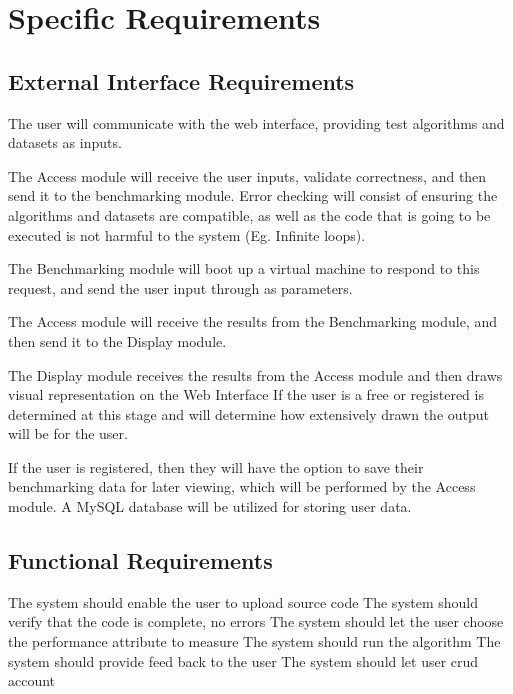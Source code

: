 \documentclass[runningheads,a4paper]{article}
\begin{document}

\section{Specific Requirements}
	\subsection{External Interface Requirements}
		\begin{EIREnum}
			\item The user will communicate with the web interface, providing test algorithms and datasets as inputs.
			\item The Access module will receive the user inputs, validate correctness, and then send it to the benchmarking module. \newline
				Error checking will consist of ensuring the algorithms and datasets are compatible, as well as the code that is going to be executed is not harmful to the system (Eg. Infinite loops).
			\item The Benchmarking module will boot up a virtual machine to respond to this request, and send the user input through as parameters.
			\item The Access module will receive the results from the Benchmarking module, and then send it to the Display module.
			\item The Display module receives the results from the Access module and then draws visual representation on the Web Interface \newline
				If the user is a free or registered is determined at this stage and will determine how extensively drawn the output will be for the user.
			\item If the user is registered, then they will have the option to save their benchmarking data for later viewing, which will be performed by the Access module. \newline
				A MySQL database will be utilized for storing user data.
		\end{EIREnum}
	

\subsection{Functional Requirements}
	The system should enable the user to upload source code
	The system should verify that the code is complete, no errors
	The system should let the user choose the performance attribute to measure
	The system should run the algorithm
	The system should provide feed back to the user 
	The system should let user crud account
\end{document}
